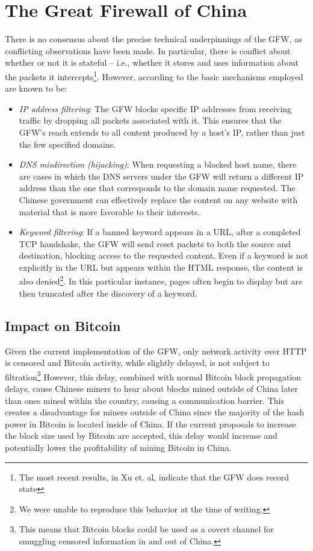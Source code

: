 \section{The Great Firewall of China}
There is no consensus about the precise technical underpinnings of the GFW, as conflicting observations have been made. In particular, there is conflict about whether or not it is stateful -- i.e., whether it stores and uses information about the packets it intercepts\footnote{The most recent results, in Xu et. al\cite{Xu2011}, indicate that the GFW does record state}. However, according to \cite{GFWStanord} the basic mechanisms employed are known to be:

\begin{itemize}
\item \textit{IP address filtering}:
The GFW blocks specific IP addresses from receiving traffic by dropping all packets associated with it. This ensures that the GFW's reach extends to all content produced by a host's IP, rather than just the few specified domains.

\item \textit{DNS misdirection (hijacking)}:
When requesting a blocked host name, there are cases in which the DNS servers under the GFW will return a different IP address than the one that corresponds to the domain name requested. The Chinese government can effectively replace the content on any website with material that is more favorable to their interests.

\item \textit{Keyword filtering}:
If a banned keyword appears in a URL, after a completed TCP handshake, the GFW will send reset packets to both the source and destination, blocking access to the requested content. Even if a keyword is not explicitly in the URL but appears within the HTML response, the content is also denied\footnote{We were unable to reproduce this behavior at the time of writing.}. In this particular instance, pages often begin to display but are then truncated after the discovery of a keyword.
\end{itemize}

\subsection{Impact on Bitcoin}
Given the current implementation of the GFW, only network activity over HTTP is censored and Bitcoin activity, while slightly delayed, is not subject to filtration\footnote{This means that Bitcoin blocks could be used as a covert channel for smuggling censored information in and out of China.} However, this delay, combined with normal Bitcoin block propagation delays, cause Chinese miners to hear about blocks mined outside of China later than ones mined within the country, causing a communication barrier. This creates a disadvantage for miners outside of China since the majority of the hash power in Bitcoin is located inside of China. If the current proposals to increase the block size used by Bitcoin are accepted, this delay would increase and potentially lower the profitability of mining Bitcoin in China.  \cite{nasdaq}